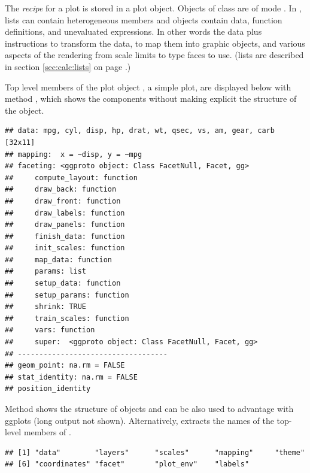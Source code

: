 \documentclass[krantz2]{krantz}\usepackage{knitr}
\begin{document}
\begin{explainbox}
The \emph{recipe} for a plot is stored in a  plot object. Objects of class  are of mode . In \Rlang, lists can contain heterogeneous members and  objects contain data, function definitions, and unevaluated expressions. In other words the data plus instructions to transform the data, to map them into graphic objects, and various aspects of the rendering from scale limits to type faces to use. (\Rlang lists are described in section \ref{sec:calc:lists} on page \pageref{sec:calc:lists}.)

Top level members of the  plot object , a simple plot, are displayed below with method , which shows the components without making explicit the structure of the object.

\begin{knitrout}\footnotesize
{}\color{fgcolor}\begin{kframe}
\begin{alltt}
\end{alltt}
\begin{verbatim}
## data: mpg, cyl, disp, hp, drat, wt, qsec, vs, am, gear, carb [32x11]
## mapping:  x = ~disp, y = ~mpg
## faceting: <ggproto object: Class FacetNull, Facet, gg>
##     compute_layout: function
##     draw_back: function
##     draw_front: function
##     draw_labels: function
##     draw_panels: function
##     finish_data: function
##     init_scales: function
##     map_data: function
##     params: list
##     setup_data: function
##     setup_params: function
##     shrink: TRUE
##     train_scales: function
##     vars: function
##     super:  <ggproto object: Class FacetNull, Facet, gg>
## -----------------------------------
## geom_point: na.rm = FALSE
## stat_identity: na.rm = FALSE
## position_identity
\end{verbatim}
\end{kframe}
\end{knitrout}

Method  shows the structure of objects and can be also used to advantage with ggplots (long output not shown). Alternatively,  extracts the names of the top-level members of .

\begin{knitrout}\footnotesize
{}\color{fgcolor}\begin{kframe}
\begin{alltt}
\end{alltt}
\begin{verbatim}
## [1] "data"        "layers"      "scales"      "mapping"     "theme"      
## [6] "coordinates" "facet"       "plot_env"    "labels"
\end{verbatim}
\end{kframe}
\end{knitrout}
\end{explainbox}
\end{document}
